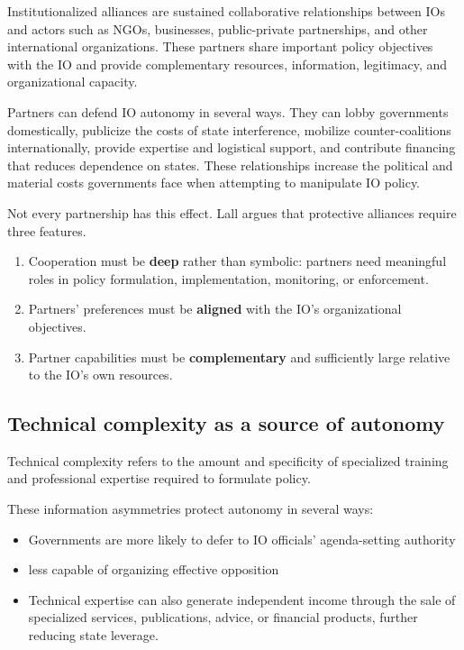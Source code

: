Institutionalized alliances are sustained collaborative relationships between IOs and actors such as NGOs, businesses, public-private partnerships, and other international organizations. These partners share important policy objectives with the IO and provide complementary resources, information, legitimacy, and organizational capacity.

Partners can defend IO autonomy in several ways. They can lobby governments domestically, publicize the costs of state interference, mobilize counter-coalitions internationally, provide expertise and logistical support, and contribute financing that reduces dependence on states. These relationships increase the political and material costs governments face when attempting to manipulate IO policy.

Not every partnership has this effect. Lall argues that protective alliances require three features.

\begin{enumerate}
    \item Cooperation must be \textbf{deep} rather than symbolic: partners need meaningful roles in policy formulation, implementation, monitoring, or enforcement.
    \item Partners' preferences must be \textbf{aligned} with the IO's organizational objectives.
    \item Partner capabilities must be \textbf{complementary} and sufficiently large relative to the IO's own resources.
\end{enumerate}

\subsection{Technical complexity as a source of autonomy}

Technical complexity refers to the amount and specificity of specialized training and professional expertise required to formulate policy.

These information asymmetries protect autonomy in several ways:
\begin{itemize}
    \item Governments are more likely to defer to IO officials' agenda-setting authority
    \item less capable of organizing effective opposition
    \item Technical expertise can also generate independent income through the sale of specialized services, publications, advice, or financial products, further reducing state leverage.
\end{itemize}

